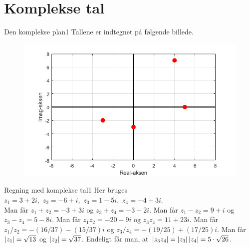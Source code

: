 \section{Komplekse tal}
\begin{opgave}{Den komplekse plan}{1}
Tallene er indtegnet på følgende billede.
\begin{figure}[h!]
	\centering
	\includegraphics[scale=0.6]{matematik/fig/komplekse_tal_i_plan_opg.png}
\end{figure}
\end{opgave}
\begin{opgave}{Regning med komplekse tal}{1}
Her bruges $z_1 = 3+2i, \, \, z_2 = -6+i, \, \, z_3 = 1-5i, \, \, z_4 = -4+3i$.\\
\opg Man får $z_1+z_2 = -3+3i$ og $z_3+z_4 = -3-2i$.
\opg Man får $z_1-z_2 = 9+i$ og  $z_3-z_4 = 5-8i$.
\opg Man får $z_1z_2 = -20-9i$ og $z_3z_4 = 11+23i$.
\opg Man får $z_1/z_2 = -(16/37) - (15/37)i$ og $z_3/z_4 = -(19/25)+(17/25)i$.
\opg Man får $\left| z_1 \right| = \sqrt{13}$ og $\left| z_2 \right| = \sqrt{37}$. Endeligt får man, at $\left| z_3z_4 \right| = \left| z_3 \right| \left| z_4 \right| = 5 \cdot \sqrt{26}$.
\end{opgave}

